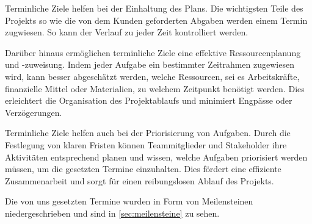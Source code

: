 Terminliche Ziele helfen bei der Einhaltung des Plans.
Die wichtigsten Teile des Projekts so wie die von dem Kunden geforderten Abgaben werden einem Termin zugwiesen.
So kann der Verlauf zu jeder Zeit kontrolliert werden. \medskip

Darüber hinaus ermöglichen terminliche Ziele eine effektive Ressourcenplanung und -zuweisung.
Indem jeder Aufgabe ein bestimmter Zeitrahmen zugewiesen wird, kann besser abgeschätzt werden,
welche Ressourcen, sei es Arbeitskräfte, finanzielle Mittel oder Materialien, zu welchem Zeitpunkt benötigt werden.
Dies erleichtert die Organisation des Projektablaufs und minimiert Engpässe oder Verzögerungen. \medskip

Terminliche Ziele helfen auch bei der Priorisierung von Aufgaben.
Durch die Festlegung von klaren Fristen können Teammitglieder und Stakeholder ihre Aktivitäten entsprechend
planen und wissen, welche Aufgaben priorisiert werden müssen, um die gesetzten Termine einzuhalten.
Dies fördert eine effiziente Zusammenarbeit und sorgt für einen reibungslosen Ablauf des Projekts. \medskip

Die von uns gesetzten Termine wurden in Form von Meilensteinen niedergeschrieben und sind in
\autoref{sec:meilensteine} zu sehen.